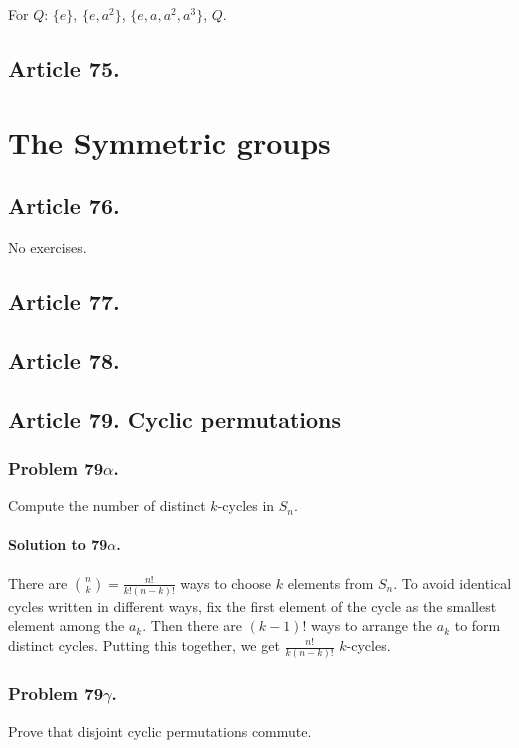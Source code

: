 For $Q$: $\{e\}$, $\{e, a^2\}$, $\{e, a, a^2, a^3\}$, $Q$.
\subsection{Article 75.}



\section{The Symmetric groups}



\subsection{Article 76.}

No exercises.
\subsection{Article 77.}

\subsection{Article 78.}

\subsection{Article 79. Cyclic permutations}
\subsubsection{Problem 79$\alpha$.}
Compute the number of distinct $k$-cycles in $S_n$.

\paragraph*{Solution to 79$\alpha$.}
There are $\binom{n}{k} = \frac{n!}{k!(n-k)!}$
ways to choose $k$ elements from $S_n$. To avoid identical cycles written in
different ways, fix the first element of the cycle as the smallest element among
the $a_k$. Then there are $(k-1)!$ ways to arrange the $a_k$ to form distinct
cycles. Putting this together, we get $ \frac{n!}{k(n-k)!}$ $k$-cycles.

\subsubsection{Problem 79$\gamma$.}
Prove that disjoint cyclic permutations commute.

